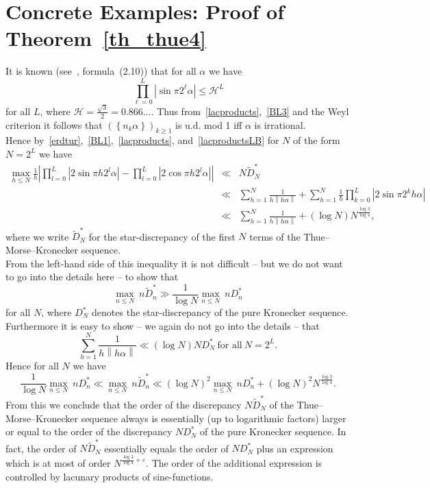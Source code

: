 \documentclass[12pt]{amsart}
\newcommand {\ve} {\varepsilon}
\begin{document}
\section{Concrete Examples: Proof of Theorem~\ref{th_thue4}} \label{sect_proof_th4}

It is known (see~\cite{foumau}, formula~(2.10)) that for all $\alpha$ we have
\begin{equation} \label{F20}
\prod^{L}_{\ell=0} \left|\sin \pi 2^{\ell} \alpha\right| \leq \mathcal{H}^{L}
\end{equation}
for all $L$, where $\mathcal{H} = \frac{\sqrt{3}}{2} = 0.866 \ldots$. Thus from~\eqref{lacproducts},~\eqref{BL3} and the Weyl criterion it follows that $\left(\left\{n_{k} \alpha\right\}\right)_{k\geq 1}$ is u.d. mod 1 iff $\alpha$ is irrational.\\
Hence by~\eqref{erdtur},~\eqref{BL1},~\eqref{lacproducts}, and~\eqref{lacproductsLB} for $N$ of the form $N=2^{L}$ we have
\begin{eqnarray*}
\underset{h\leq N}{\max} \frac{1}{h} \left|\prod^{L}_{l=0} |2 \sin \pi h 2^{l} \alpha | - \prod^{L}_{l=0} |2 \cos \pi h 2^{l} \alpha |\right| & \ll & N\widetilde{D}_{N}^{*} \\
& \ll & \sum^{N}_{h=1} \frac{1}{h\left\|h \alpha\right\|} + \sum^{N}_{h=1} \frac{1}{h} \prod^{L}_{k=0} \left|2 \sin \pi 2^{k} h \alpha\right| \\
& \ll & \sum^{N}_{h=1} \frac{1}{h \left\|h \alpha\right\|}+ (\log N) N^{\frac{\log3}{\log 4}},
\end{eqnarray*}
where we write $\widetilde{D}_{N}^{*}$ for the star-discrepancy of the first $N$ terms of the Thue--Morse--Kronecker sequence.\\

From the left-hand side of this inequality it is not difficult -- but we do not want to go into the details here -- to show that
$$
\underset{n \leq N}{\max} ~n \widetilde{D}_{n}^{*} \gg \frac{1}{\log N} \underset{n \leq N}{\max}~ n D_{n}^{*}
$$
for all $N$, where $D^{*}_{N}$ denotes the star-discrepancy of the pure Kronecker sequence.\\

Furthermore it is easy to show -- we again do not go into the details -- that
$$
\sum^{N}_{h=1} \frac{1}{h \left\|h \alpha\right\|} \ll (\log N) N D_{N}^{*} ~\mbox{for all}~ N=2^{L}.
$$
Hence for all $N$ we have
\begin{equation} \label{BL2}
\frac{1}{\log N} \underset{n \leq N}{\max} ~n D_{n}^{*} \ll \underset{n \leq N}{\max}~ n \widetilde{D}_{n}^{*} \ll \left(\log N\right)^{2} \underset{n \leq N}{\max} ~n D_{n}^{*} + \left(\log N\right)^{2} N^{\frac{\log3}{\log 4}}.
\end{equation}
From this we conclude that the order of the discrepancy $N\widetilde{D}_{N}^{*}$ of the Thue--Morse--Kronecker sequence always is essentially (up to logarithmic factors) larger or equal to the order of the discrepancy $N D_{N}^{*}$ of the pure Kronecker sequence. In fact, the order of $N \widetilde{D}_{N}^{*}$ essentially equals the order of $N D_{N}^{*}$ plus an expression which is at most of order $N^{\frac{\log 3}{\log 4}+ \ve}$. The order of the additional expression is controlled by lacunary products of sine-functions.\\
\end{document}
